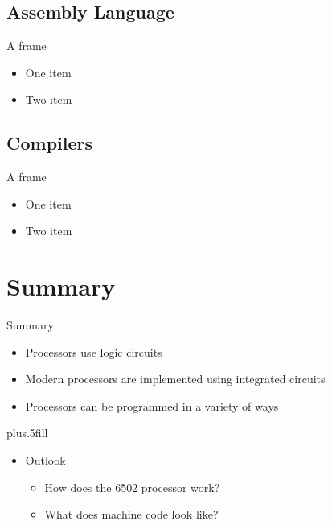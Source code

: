 \documentclass{beamer}
\begin{document}
\subsection[Assembly]{Assembly Language}

\begin{frame}{A frame}
  \begin{itemize}
  \item
    One item
  \item
    Two item
  \end{itemize}
\end{frame}


\subsection[Compilers]{Compilers}

\begin{frame}{A frame}
  \begin{itemize}
  \item
    One item
  \item
    Two item
  \end{itemize}
\end{frame}





\section{Summary}

\begin{frame}{Summary}

  \begin{itemize}
  \item
    Processors use logic circuits
  \item
    Modern processors are implemented using integrated circuits
  \item
    Processors can be programmed in a variety of ways
  \end{itemize}
  
  \vskip0pt plus.5fill
  \begin{itemize}
  \item
    Outlook
    \begin{itemize}
    \item
      How does the 6502 processor work?
    \item
      What does machine code look like?
    \end{itemize}
  \end{itemize}
\end{frame}
\end{document}
